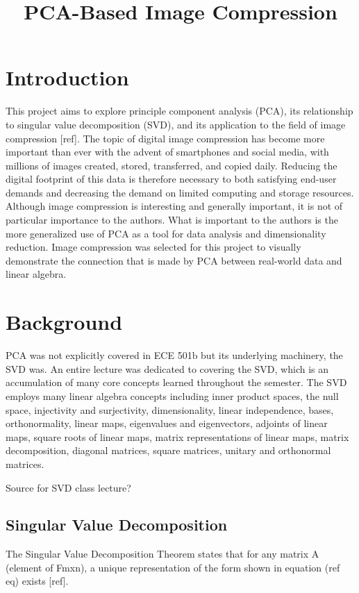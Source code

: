 \documentclass[conference]{IEEEtran}
\title{PCA-Based Image Compression}
\author{
\IEEEauthorblockN{Owen Sowatzke}
\IEEEauthorblockA{\textit{Electrical Engineering Department} \\
\textit{University of Arizona}\\
Tucson, USA \\
osowatzke@arizona.edu}
\and
\IEEEauthorblockN{Scott Thoesen}
\IEEEauthorblockA{\textit{Electrical Engineering Department} \\
\textit{University of Arizona}\\
Tucson, USA \\
thoesens@arizona.edu}}
\begin{document}
	\maketitle
		
    \section{Introduction}
    This project aims to explore principle component analysis (PCA), its relationship to singular value decomposition (SVD), and its application to the field of image compression [ref]. The topic of digital image compression has become more important than ever with the advent of smartphones and social media, with millions of images created, stored, transferred, and copied daily. Reducing the digital footprint of this data is therefore necessary to both satisfying end-user demands and decreasing the demand on limited computing and storage resources. Although image compression is interesting and generally important, it is not of particular importance to the authors. What is important to the authors is the more generalized use of PCA as a tool for data analysis and dimensionality reduction. Image compression was selected for this project to visually demonstrate the connection that is made by PCA between real-world data and linear algebra.

    \section{Background}
    PCA was not explicitly covered in ECE 501b but its underlying machinery, the SVD was. An entire lecture was dedicated to covering the SVD, which is an accumulation of many core concepts learned throughout the semester. The SVD employs many linear algebra concepts including inner product spaces, the null space, injectivity and surjectivity, dimensionality, linear independence, bases, orthonormality, linear maps, eigenvalues and eigenvectors, adjoints of linear maps, square roots of linear maps, matrix representations of linear maps, matrix decomposition, diagonal matrices, square matrices, unitary and orthonormal matrices.

    Source for SVD class lecture?


    \subsection{Singular Value Decomposition}
    The Singular Value Decomposition Theorem states that for any matrix A (element of Fmxn), a unique representation of the form shown in equation (ref eq) exists [ref].
\end{document}

